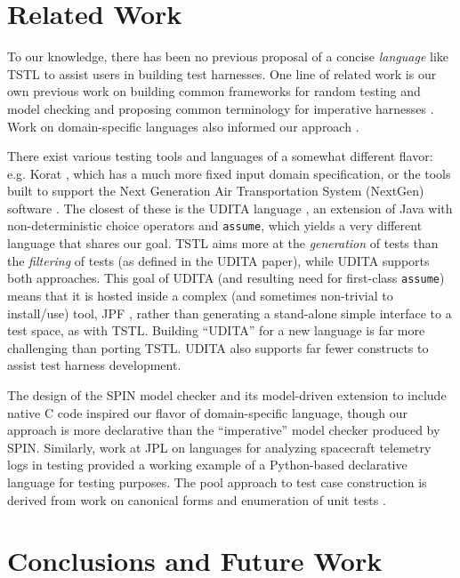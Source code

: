 \documentclass[runningheads,a4paper]{llncs}
\begin{document}
\vspace{-0.1in}

\section{Related Work}


To our knowledge, there has been no previous proposal of a concise
\emph{language} like TSTL to assist users in building test
harnesses.  One line of related work is our own previous work on
building common frameworks for random testing and model checking
\cite{woda08} and proposing common terminology for imperative
harnesses \cite{woda12}.  Work on
domain-specific languages also informed our approach \cite{Fow10}.

There exist various testing tools and languages of a somewhat
different flavor: e.g. Korat \cite{Korat}, which has a much more fixed
input domain specification, or the tools built to support the Next
Generation Air Transportation System (NextGen) software
\cite{TameInputs}.  The closest of these is the UDITA language
\cite{UDITA}, an extension of Java with non-deterministic choice
operators and {\tt assume}, which yields a very different language
that shares our goal.  TSTL aims more at the \emph{generation} of
tests than the \emph{filtering} of tests (as defined in the UDITA
paper), while UDITA supports both approaches.  This goal of UDITA (and
resulting need for first-class {\tt assume}) means that it is hosted
inside a complex (and sometimes non-trivial to install/use) tool, JPF
\cite{JPF2}, rather than generating a stand-alone simple interface to
a test space, as with TSTL.  Building ``UDITA'' for a new language is
far more challenging than porting TSTL.  UDITA also supports far fewer
constructs to assist test harness development.

The design of the SPIN model checker \cite{SPIN} and its model-driven
extension to include native C code \cite{ModelDriven} inspired our
flavor of domain-specific language, though our approach is more
declarative than the ``imperative'' model checker produced by SPIN.
Similarly, work at JPL on languages for analyzing spacecraft telemetry
logs in testing \cite{scriptstospecs} provided a working example of a
Python-based declarative language for testing purposes.  The pool
approach to test case construction is derived from work on canonical
forms and enumeration of unit tests \cite{AndrewsTR}.

\section{Conclusions and Future Work}
\end{document}
